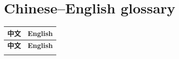 

	\chapter{Chinese–English glossary}
	\begin{center}
		\setlength\LTleft{0pt}
		\setlength\LTright{0pt}
		\begin{longtable}{|>{\raggedright\arraybackslash}p{5cm}|>{\raggedright\arraybackslash}p{8cm}|}
			\hline
			\rowcolor{gray!35}
			\textbf{中文} & \textbf{English} \\
			\hline
			\endfirsthead

			\hline
			\rowcolor{gray!35}
			\textbf{中文} & \textbf{English} \\
			\hline
			\endhead

			\hline
			\endfoot

			\hline
			\endlastfoot


\end{longtable}
\end{center}
